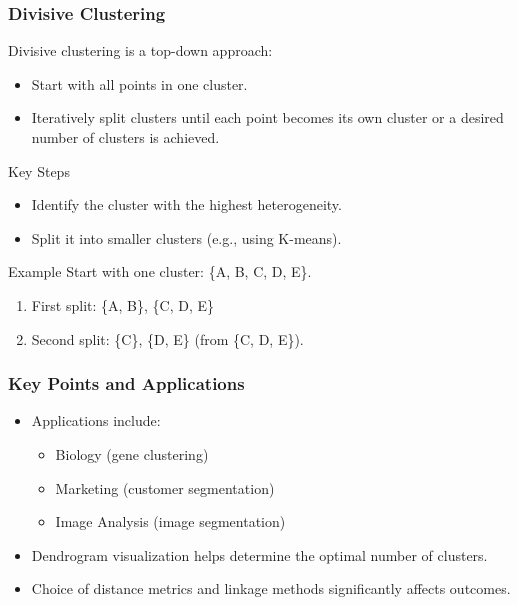 \documentclass[aspectratio=169]{beamer}
\begin{document}
\begin{frame}[fragile]
    \frametitle{Divisive Clustering}
    Divisive clustering is a top-down approach:
    \begin{itemize}
        \item Start with all points in one cluster.
        \item Iteratively split clusters until each point becomes its own cluster or a desired number of clusters is achieved.
    \end{itemize}

    \begin{block}{Key Steps}
        \begin{itemize}
            \item Identify the cluster with the highest heterogeneity.
            \item Split it into smaller clusters (e.g., using K-means).
        \end{itemize}
    \end{block}
    
    \begin{block}{Example}
        Start with one cluster: \{A, B, C, D, E\}.
        \begin{enumerate}
            \item First split: \{A, B\}, \{C, D, E\}
            \item Second split: \{C\}, \{D, E\} (from \{C, D, E\}).
        \end{enumerate}
    \end{block}
\end{frame}

\begin{frame}[fragile]
    \frametitle{Key Points and Applications}
    \begin{itemize}
        \item Applications include:
        \begin{itemize}
            \item Biology (gene clustering)
            \item Marketing (customer segmentation)
            \item Image Analysis (image segmentation)
        \end{itemize}
        \item Dendrogram visualization helps determine the optimal number of clusters.
        \item Choice of distance metrics and linkage methods significantly affects outcomes.
    \end{itemize}
\end{frame}
\end{document}

